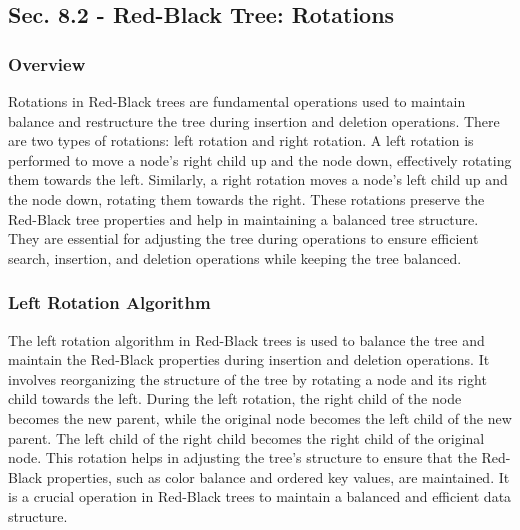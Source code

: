 \subsection*{Sec. 8.2 - Red-Black Tree: Rotations}

\subsubsection{Overview}

Rotations in Red-Black trees are fundamental operations used to maintain balance and restructure the tree during insertion and deletion operations. There are two types of rotations: left rotation and right rotation. A left rotation is performed to move a node's right child up and the node down, effectively rotating them towards the left. 
Similarly, a right rotation moves a node's left child up and the node down, rotating them towards the right. These rotations preserve the Red-Black tree properties and help in maintaining a balanced tree structure. They are essential for adjusting the tree during operations to ensure efficient search, insertion, and deletion operations 
while keeping the tree balanced.

\subsubsection{Left Rotation Algorithm}

The left rotation algorithm in Red-Black trees is used to balance the tree and maintain the Red-Black properties during insertion and deletion operations. It involves reorganizing the structure of the tree by rotating a node and its right child towards the left. During the left rotation, the right child of the node becomes the new parent,
while the original node becomes the left child of the new parent. The left child of the right child becomes the right child of the original node. This rotation helps in adjusting the tree's structure to ensure that the Red-Black properties, such as color balance and ordered key values, are maintained. It is a crucial operation in Red-Black trees 
to maintain a balanced and efficient data structure.

